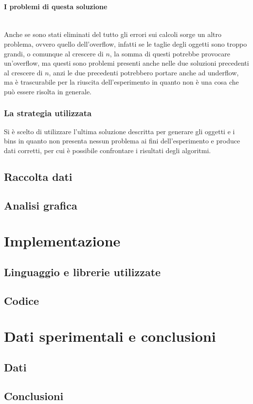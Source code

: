 \paragraph{I problemi di questa soluzione}\mbox{}\\
Anche se sono stati eliminati del tutto gli errori sui calcoli sorge un altro problema, ovvero quello dell'overflow, infatti se le taglie
degli oggetti sono troppo grandi, o comunque al crescere di $ n $, la somma di questi potrebbe provocare un'overflow, ma questi sono problemi
presenti anche nelle due soluzioni precedenti al crescere di $ n $, anzi le due precedenti potrebbero portare anche ad underflow, ma è trascurabile per
la riuscita dell'esperimento in quanto non è una cosa che può essere risolta in generale.


\subsubsection{La strategia utilizzata}
Si è scelto di utilizzare l'ultima soluzione descritta per generare gli oggetti e i bins in quanto non presenta nessun problema ai fini
dell'esperimento e produce dati corretti, per cui è possibile confrontare i risultati degli algoritmi.


\subsection{Raccolta dati}


\subsection{Analisi grafica}



\section{Implementazione}

\subsection{Linguaggio e librerie utilizzate}


\subsection{Codice}



\section{Dati sperimentali e conclusioni}

\subsection{Dati}


\subsection{Conclusioni}
